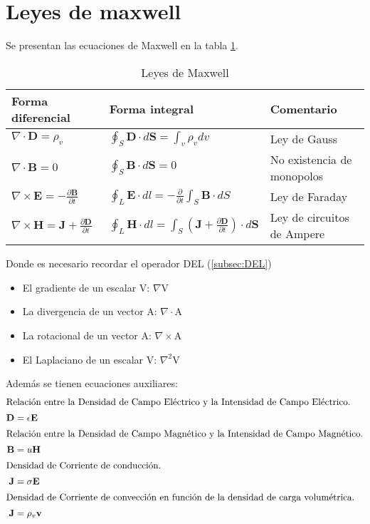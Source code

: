 \documentclass[12pt,fleqn,a4paper,oneside]{LegrandOrangeBook}
\begin{document}
\section{Leyes de maxwell}
Se presentan las ecuaciones de Maxwell en la tabla \ref{tab:maxwell}.
\begin{table}[]
\begin{tabular}{|l|l|l|}
\hline
\rowcolor[HTML]{0066cc} 
Forma diferencial & Forma integral                                                                 & Comentario\\ \hline
$\nabla\cdot \textbf{D}=\rho_v$  & $\oint_S\textbf{D}\cdot d\textbf{S}=\int_v\rho_vdv                                 $ & Ley de Gauss\\ \hline
$\nabla\cdot \textbf{B}=0$ & $\oint_S\textbf{B}\cdot d\textbf{S}=0
$ & No existencia de monopolos \\ \hline
$\nabla\times \textbf{E}=-\frac{\partial \textbf{B}}{\partial t}$    & $\oint_L\textbf{E}\cdot dl=-\frac{\partial}{\partial t}\int_S\textbf{B}\cdot dS
$ & Ley de Faraday\\ \hline
$\nabla\times \textbf{H}=\textbf{J} + \frac{\partial \textbf{D}}{\partial t}$ & $\oint_L\textbf{H}\cdot dl=\int_S\left(\textbf{J} + \frac{\partial \textbf{D}}{\partial t}\right)\cdot d\textbf{S}$ & Ley de circuitos de Ampere \\ \hline
\end{tabular}
\caption{Leyes de Maxwell}
\label{tab:maxwell}
\end{table}
Donde es necesario recordar el operador DEL (\ref{subsec:DEL})
\begin{itemize}
\item El gradiente de un escalar V: $\nabla$V
\item La divergencia de un vector A: $\nabla\cdot$A
\item La rotacional de un vector A: $\nabla\times$A
\item El Laplaciano de un escalar V: $\nabla^2$V
\end{itemize}
Además se tienen ecuaciones auxiliares:
\begin{subequations}
\begin{align}
\intertext{Relación entre la Densidad de Campo Eléctrico y la Intensidad de Campo Eléctrico.}
\textbf{D}&= \epsilon \textbf{E}\\
\intertext{Relación entre la Densidad de Campo Magnético y la Intensidad de Campo Magnético.}
\textbf{B}&=u\textbf{H}\\
\intertext{Densidad de Corriente de conducción.}
\textbf{J}&=\sigma\textbf{E}\\
\intertext{Densidad de Corriente de convección en función de la densidad de carga volumétrica.}
\textbf{J}&=\rho_v\textbf{v}
\end{align}
\end{subequations}
\end{document}
